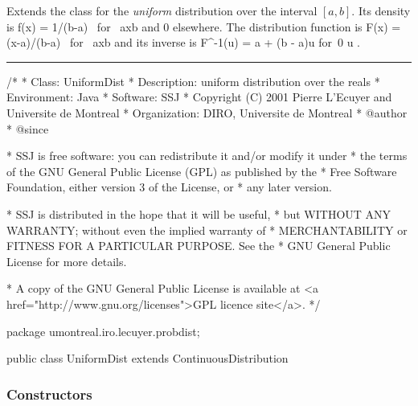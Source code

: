 
Extends the class  for
the {\em uniform\/} distribution \cite[page 276]{tJOH95b}
over the interval $[a,b]$.
Its density is
\eq
  f(x) = 1/(b-a)  \qquad\mbox{ for } a\le x\le b   
\endeq
and 0 elsewhere.  The distribution function is
\eq
   F(x) = (x-a)/(b-a) \qquad\mbox { for } a\le x\le b
\endeq
and its inverse is
\eq
   F^{-1}(u) = a + (b - a)u
      \qquad\mbox{for }0 \le u .     
\endeq


\bigskip\hrule

\begin{code}
\begin{hide}
/*
 * Class:        UniformDist
 * Description:  uniform distribution over the reals
 * Environment:  Java
 * Software:     SSJ
 * Copyright (C) 2001  Pierre L'Ecuyer and Universite de Montreal
 * Organization: DIRO, Universite de Montreal
 * @author
 * @since

 * SSJ is free software: you can redistribute it and/or modify it under
 * the terms of the GNU General Public License (GPL) as published by the
 * Free Software Foundation, either version 3 of the License, or
 * any later version.

 * SSJ is distributed in the hope that it will be useful,
 * but WITHOUT ANY WARRANTY; without even the implied warranty of
 * MERCHANTABILITY or FITNESS FOR A PARTICULAR PURPOSE.  See the
 * GNU General Public License for more details.

 * A copy of the GNU General Public License is available at
   <a href="http://www.gnu.org/licenses">GPL licence site</a>.
 */
\end{hide}
package umontreal.iro.lecuyer.probdist;


public class UniformDist extends ContinuousDistribution\begin{hide} {
   private double a;
   private double b;
\end{hide}\end{code}
\subsubsection* {Constructors}

